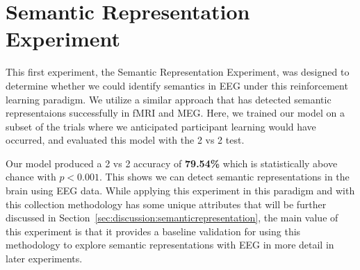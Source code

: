 \section{Semantic Representation Experiment}
This first experiment, the Semantic Representation Experiment, was designed to 
determine whether we could identify semantics in EEG under this reinforcement 
learning paradigm. We utilize a similar approach that has detected semantic 
representaions successfully in fMRI and MEG. Here, we trained our model on a 
subset of the trials where we anticipated participant learning would have 
occurred, and evaluated this model with the 2 vs 2 test. 

Our model produced a 2 vs 2 accuracy of \textbf{79.54\%} which is statistically 
above chance with $p < 0.001$. This shows we can detect semantic 
representations in the brain using EEG data. While applying this experiment in 
this paradigm and with this collection methodology has some unique attributes 
that will be further discussed in 
Section~\ref{sec:discussion:semanticrepresentation}, the main value of this 
experiment is that it provides a baseline validation for using this methodology 
to explore semantic representations with EEG in more detail in later 
experiments. 
